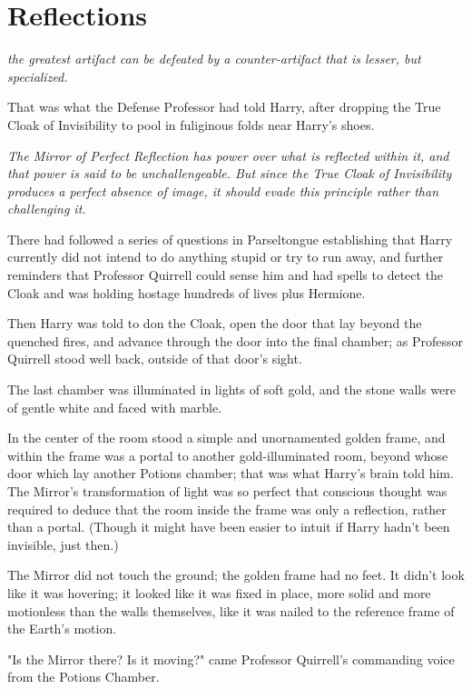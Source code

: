 \chapter{Reflections}

 \emph{the
greatest artifact can be defeated by a counter-artifact that is lesser, but
specialized.}

That was what the Defense Professor had told Harry, after dropping the True
Cloak of Invisibility to pool in fuliginous folds near Harry's shoes.

\emph{The Mirror of Perfect Reflection has power over what is reflected within
it, and that power is said to be unchallengeable. But since the True Cloak of
Invisibility produces a perfect absence of image, it should evade this
principle rather than challenging it.}

There had followed a series of questions in Parseltongue establishing that
Harry currently did not intend to do anything stupid or try to run away, and
further reminders that Professor Quirrell could sense him and had spells to
detect the Cloak and was holding hostage hundreds of lives plus Hermione.

Then Harry was told to don the Cloak, open the door that lay beyond the
quenched fires, and advance through the door into the final chamber; as
Professor Quirrell stood well back, outside of that door's sight.

The last chamber was illuminated in lights of soft gold, and the stone walls
were of gentle white and faced with marble.

In the center of the room stood a simple and unornamented golden frame, and
within the frame was a portal to another gold-illuminated room, beyond whose
door which lay another Potions chamber; that was what Harry's brain told him.
The Mirror's transformation of light was so perfect that conscious thought was
required to deduce that the room inside the frame was only a reflection, rather
than a portal. (Though it might have been easier to intuit if Harry hadn't been
invisible, just then.)

The Mirror did not touch the ground; the golden frame had no feet. It didn't
look like it was hovering; it looked like it was fixed in place, more solid and
more motionless than the walls themselves, like it was nailed to the reference
frame of the Earth's motion.

"Is the Mirror there? Is it moving?" came Professor Quirrell's commanding voice
from the Potions Chamber.

